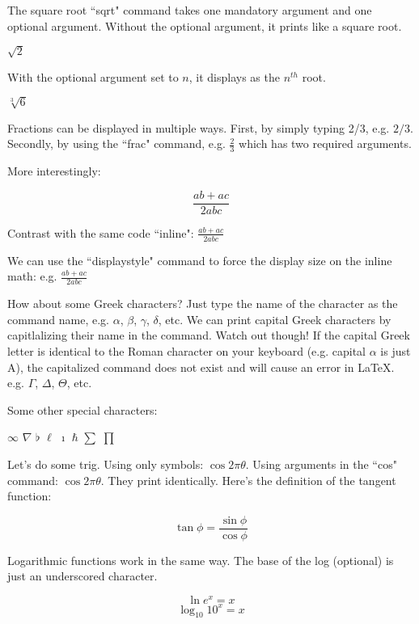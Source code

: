 \documentclass{article}
\begin{document}
The square root ``sqrt" command takes one mandatory argument and one optional argument.  Without the optional argument, it prints like a square root. 

$\sqrt{2}$

With the optional argument set to $n$, it displays as the $n^{th}$ root.

$\sqrt[3]{6}$

Fractions can be displayed in multiple ways.  First, by simply typing 2/3, e.g. $2/3$.  Secondly, by using the ``frac" command, e.g. $\frac{2}{3}$ which has two required arguments.

More interestingly:

$$\frac{ab + ac}{2abc}$$

Contrast with the same code ``inline": $\frac{ab + ac}{2abc}$

We can use the ``displaystyle" command to force the display size on the inline math: e.g. $\displaystyle{\frac{ab + ac}{2abc}}$


How about some Greek characters?  Just type the name of the character as the command name, e.g. $\alpha$, $\beta$, $\gamma$, $\delta$, etc.  We can print capital Greek characters by capitlalizing their name in the command.  Watch out though!  If the capital Greek letter is identical to the Roman character on your keyboard (e.g. capital $\alpha$ is just A), the capitalized command does not exist and will cause an error in LaTeX.  e.g. $\Gamma$, $\Delta$, $\Theta$, etc.


Some other special characters:

$\infty$
$\nabla$
$\flat$
$\ell$
$\imath$
$\hbar$
$\sum$
$\prod$
 

Let's do some trig.  Using only symbols: $\cos 2\pi \theta$.  Using arguments in the ``cos" command: $\cos{2\pi\theta}$.  They print identically.  Here's the definition of the tangent function:

$$\tan \phi = \frac{\sin \phi}{\cos \phi}$$

Logarithmic functions work in the same way.  The base of the log (optional) is just an underscored character.

$$\ln e^x = x$$
$$\log_{10} 10^x = x$$
\end{document}
